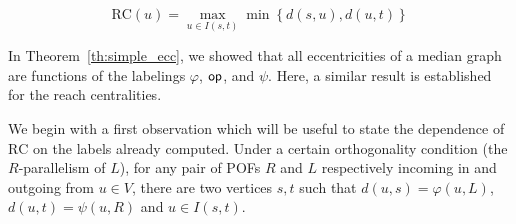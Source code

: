 \documentclass{article}
\newcommand{\set}[1]{\left\{ #1 \right\}}
\newcommand{\opp}{\mbox{\textsf{op}}}
\newcommand{\rc}{\mbox{RC}}
\begin{document}
\begin{equation}
\rc(u) = \max_{u \in I(s,t)} \min \set{d(s,u),d(u,t)}
\label{eq:reach_centrality}
\end{equation}

In Theorem~\ref{th:simple_ecc}, we showed that all eccentricities of a median graph are functions of the labelings $\varphi$, $\opp$, and $\psi$. Here, a similar result is established for the reach centralities.

We begin with a first observation which will be useful to state the dependence of $\rc$ on the labels already computed. Under a certain orthogonality condition (the $R$-parallelism of $L$), for any pair of POFs $R$ and $L$ respectively incoming in and outgoing from $u \in V$, there are two vertices $s,t$ such that $d(u,s) = \varphi(u,L)$, $d(u,t) = \psi(u,R)$ and $u \in I(s,t)$.
\end{document}

